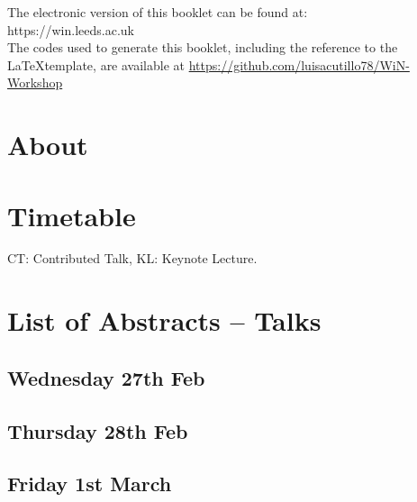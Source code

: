 \documentclass[openany, parskip=full, 12pt, a4]{scrbook}
\begin{document}
	
	
	
\mbox{}
\thispagestyle{empty}
\vfill
\begin{center}
	The electronic version of this booklet can be found at: \\
	https://win.leeds.ac.uk\\
	
	
	The codes used to generate this booklet, including the reference to the \LaTeX\space template, are available at \url{https://github.com/luisacutillo78/WiN-Workshop}
\end{center}

\newpage

\tableofcontents

\chapter{About}



\chapter{Timetable}

CT: Contributed Talk, KL: Keynote Lecture.


\chapter{List of Abstracts -- Talks}

\section{Wednesday 27th Feb}

\newpage
\section{Thursday 28th Feb}

\newpage
\section{Friday 1st March}
\end{document}
